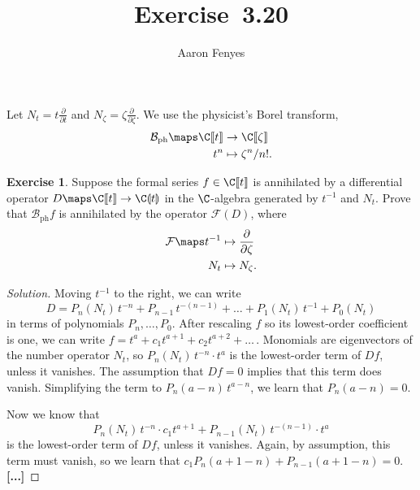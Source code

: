 \documentclass{article}
\title{Exercise~3.20}
\author{Aaron Fenyes}
\theoremstyle{definition}
\newtheorem*{exr}{Exercise}
\theoremstyle{plain}
\newcommand{\phborel}{\mathcal{B}_\text{ph}}
\newcommand{\dict}{\mathcal{F}}
\begin{document}
\maketitle
Let $N_t = t \tfrac{\partial}{\partial t}$ and $N_\zeta = \zeta \tfrac{\partial}{\partial \zeta}$. We use the physicist's Borel transform,
\begin{align*}
\phborel \maps \C\llbracket t \rrbracket & \to \C\llbracket \zeta \rrbracket \\
t^n & \mapsto \zeta^n/n!.
\end{align*}
\begin{exr}
Suppose the formal series $f \in \C\llbracket t \rrbracket$ is annihilated by a differential operator $D \maps \C\llbracket t \rrbracket \to \C\llparenthesis t \rrparenthesis$ in the $\C$-algebra generated by $t^{-1}$ and $N_t$. Prove that $\phborel f$ is annihilated by the operator $\dict(D)$, where
\begin{align*}
\dict \maps t^{-1} & \mapsto \frac{\partial}{\partial \zeta} \\
N_t & \mapsto N_\zeta.
\end{align*}
\end{exr}
\begin{proof}[Solution]
Moving $t^{-1}$ to the right, we can write
\[ D = P_n(N_t)\,t^{-n} + P_{n-1}\,t^{-(n-1)} + \ldots + P_1(N_t)\,t^{-1} + P_0(N_t) \]
in terms of polynomials $P_n, \ldots, P_0$. After rescaling $f$ so its lowest-order coefficient is one, we can write $f = t^a + c_1 t^{a+1} + c_2 t^{a+2} + \ldots\,$. Monomials are eigenvectors of the number operator $N_t$, so $P_n(N_t)\,t^{-n} \cdot t^a$ is the lowest-order term of $Df$, unless it vanishes. The assumption that $Df = 0$ implies that this term does vanish. Simplifying the term to $P_n(a-n)\,t^{a-n}$, we learn that $P_n(a-n) = 0$.

Now we know that
\[ P_n(N_t)\,t^{-n} \cdot c_1 t^{a+1} + P_{n-1}(N_t)\,t^{-(n-1)} \cdot t^a \]
is the lowest-order term of $Df$, unless it vanishes. Again, by assumption, this term must vanish, so we learn that $c_1 P_n(a+1-n) + P_{n-1}(a+1-n) = 0$. \textbf{[...]}
\end{proof}
\end{document}
